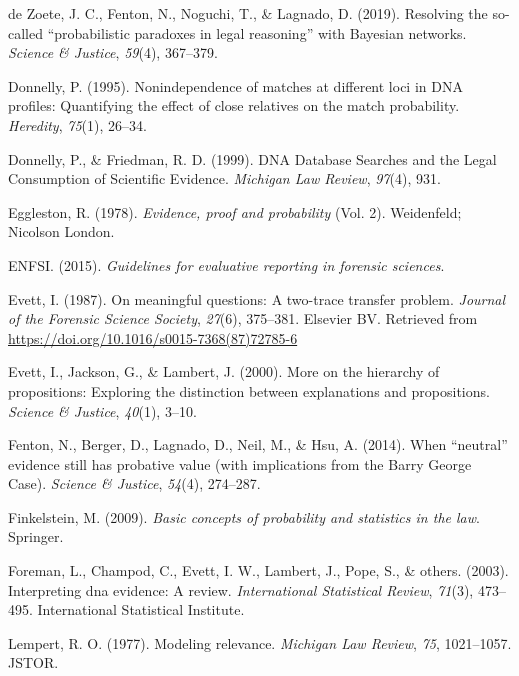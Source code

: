 \documentclass[10pt,dvipsnames,enabledeprecatedfontcommands]{scrartcl}
\begin{document}
\hypertarget{ref-dezoete2019ResolvingSocalledProbabilistic}{}
de Zoete, J. C., Fenton, N., Noguchi, T., \& Lagnado, D. (2019).
Resolving the so-called ``probabilistic paradoxes in legal reasoning''
with Bayesian networks. \emph{Science \& Justice}, \emph{59}(4),
367--379.

\hypertarget{ref-donnelly1995NonindependenceMatchesDifferent}{}
Donnelly, P. (1995). Nonindependence of matches at different loci in DNA
profiles: Quantifying the effect of close relatives on the match
probability. \emph{Heredity}, \emph{75}(1), 26--34.

\hypertarget{ref-donnelly1999DNADatabaseSearches}{}
Donnelly, P., \& Friedman, R. D. (1999). DNA Database Searches and the
Legal Consumption of Scientific Evidence. \emph{Michigan Law Review},
\emph{97}(4), 931.

\hypertarget{ref-eggleston1978evidence}{}
Eggleston, R. (1978). \emph{Evidence, proof and probability} (Vol. 2).
Weidenfeld; Nicolson London.

\hypertarget{ref-enfs2015}{}
ENFSI. (2015). \emph{Guidelines for evaluative reporting in forensic
sciences}.

\hypertarget{ref-Evett1987}{}
Evett, I. (1987). On meaningful questions: A two-trace transfer problem.
\emph{Journal of the Forensic Science Society}, \emph{27}(6), 375--381.
Elsevier BV. Retrieved from
\url{https://doi.org/10.1016/s0015-7368(87)72785-6}

\hypertarget{ref-evett2000MoreHierarchyPropositions}{}
Evett, I., Jackson, G., \& Lambert, J. (2000). More on the hierarchy of
propositions: Exploring the distinction between explanations and
propositions. \emph{Science \& Justice}, \emph{40}(1), 3--10.

\hypertarget{ref-fenton2014WhenNeutralEvidence}{}
Fenton, N., Berger, D., Lagnado, D., Neil, M., \& Hsu, A. (2014). When
``neutral'' evidence still has probative value (with implications from
the Barry George Case). \emph{Science \& Justice}, \emph{54}(4),
274--287.

\hypertarget{ref-finkelstein2009basic}{}
Finkelstein, M. (2009). \emph{Basic concepts of probability and
statistics in the law}. Springer.

\hypertarget{ref-foreman2003interpreting}{}
Foreman, L., Champod, C., Evett, I. W., Lambert, J., Pope, S., \&
others. (2003). Interpreting dna evidence: A review. \emph{International
Statistical Review}, \emph{71}(3), 473--495. International Statistical
Institute.

\hypertarget{ref-lempert1977modeling}{}
Lempert, R. O. (1977). Modeling relevance. \emph{Michigan Law Review},
\emph{75}, 1021--1057. JSTOR.
\end{document}
